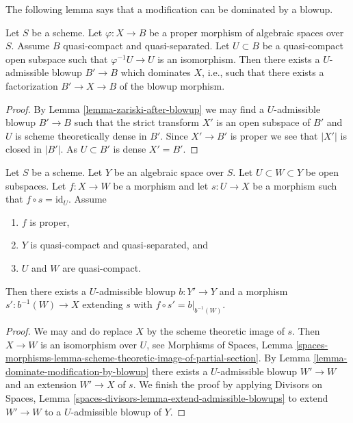 \noindent
The following lemma says that a modification can be dominated
by a blowup.

\begin{lemma}
\label{lemma-dominate-modification-by-blowup}
Let $S$ be a scheme.
Let $\varphi : X \to B$ be a proper morphism of algebraic spaces over $S$.
Assume $B$ quasi-compact and quasi-separated. Let $U \subset B$ be a
quasi-compact open subspace such that $\varphi^{-1}U \to U$ is an isomorphism.
Then there exists a $U$-admissible blowup $B' \to B$
which dominates $X$, i.e., such that there exists a factorization
$B' \to X \to B$ of the blowup morphism.
\end{lemma}

\begin{proof}
By Lemma \ref{lemma-zariski-after-blowup} we may find a $U$-admissible
blowup $B' \to B$ such that the strict transform $X'$ is an open subspace
of $B'$ and $U$ is scheme theoretically dense in $B'$.
Since $X' \to B'$ is proper we see that $|X'|$ is closed in $|B'|$.
As $U \subset B'$ is dense $X' = B'$.
\end{proof}

\begin{lemma}
\label{lemma-get-section-after-blowup}
Let $S$ be a scheme. Let $Y$ be an algebraic space over $S$.
Let $U \subset W \subset Y$ be open subspaces.
Let $f : X \to W$ be a morphism and let $s : U \to X$ be a
morphism such that $f \circ s = \text{id}_U$. Assume
\begin{enumerate}
\item $f$ is proper,
\item $Y$ is quasi-compact and quasi-separated, and
\item $U$ and $W$ are quasi-compact.
\end{enumerate}
Then there exists a $U$-admissible blowup $b : Y' \to Y$ and a morphism
$s' : b^{-1}(W) \to X$ extending $s$ with $f \circ s' = b|_{b^{-1}(W)}$.
\end{lemma}

\begin{proof}
We may and do replace $X$ by the scheme theoretic image of $s$.
Then $X \to W$ is an isomorphism over $U$, see
Morphisms of Spaces, Lemma
\ref{spaces-morphisms-lemma-scheme-theoretic-image-of-partial-section}.
By Lemma \ref{lemma-dominate-modification-by-blowup}
there exists a $U$-admissible blowup $W' \to W$ and an
extension $W' \to X$ of $s$.
We finish the proof by applying
Divisors on Spaces, Lemma \ref{spaces-divisors-lemma-extend-admissible-blowups}
to extend $W' \to W$ to a $U$-admissible blowup of $Y$.
\end{proof}







